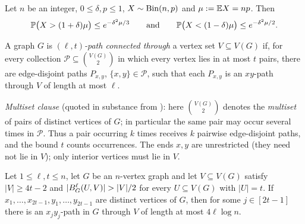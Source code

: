 \begin{citedresult}\label{s1:citChernoff}
Let $n$ be an integer, $0\le\delta,p\le1$, $X\sim\mathrm{Bin}(n,p)$ and $\mu\mathrel{:=}\mathbb{E}
X=np$. Then
\[
\mathbb{P}\bigl(X>(1+\delta)\mu\bigr)\le e^{-\delta^2\mu/3}
\qquad\text{and}\qquad
\mathbb{P}\bigl(X<(1-\delta)\mu\bigr)\le e^{-\delta^2\mu/2}.
\]

\end{citedresult}

\begin{citedresult}[{\cite[Definition~7]{BM}}]\label{s1:citDef7}
A graph $G$ is \emph{$(\ell,t)$-path connected through} a vertex set $V\subseteq
V(G)$ if, for every collection $\mathcal P\subseteq\binom{V(G)}{2}$ in which every
vertex lies in at most $t$ pairs, there are edge-disjoint paths $P_{x,y}$,
$\{x,y\}\in\mathcal P$, such that each $P_{x,y}$ is an $xy$-path through $V$ of
length at most $\ell$.

\emph{Multiset clause} (quoted in substance from \cite{BM}): here
$\binom{V(G)}{2}$ denotes the \emph{multiset} of pairs of distinct vertices of
$G$; in particular the same pair may occur several times in $\mathcal P$. Thus a
pair occurring $k$ times receives $k$ pairwise edge-disjoint paths, and the
bound $t$ counts occurrences. The ends $x,y$ are unrestricted (they need not lie
in $V$); only interior vertices must lie in $V$.
\end{citedresult}

\begin{citedresult}[{\cite[Proposition~8]{BM}}]\label{s1:citProp8}
Let $1\le\ell,t\le n$, let $G$ be an $n$-vertex graph and let $V\subseteq V(G)$
satisfy $|V|\ge4t-2$ and $|\Ball{\ell}{G}{U,V}|>|V|/2$ for every $U\subseteq
V(G)$ with $|U|=t$. If $x_1,\dots,x_{2t-1},y_1,\dots,y_{2t-1}$ are distinct
vertices of $G$, then for some $j\in[2t-1]$ there is an $x_jy_j$-path in $G$
through $V$ of length at most $4\ell\log n$.
\end{citedresult}

